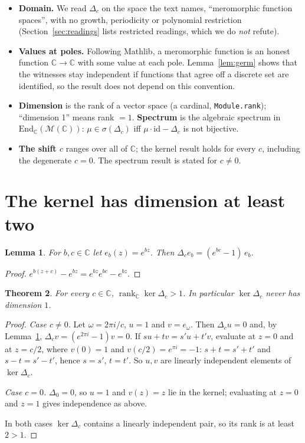 \documentclass[11pt]{article}
\newtheorem{theorem}{Theorem}
\newtheorem{lemma}[theorem]{Lemma}
\theoremstyle{definition}
\theoremstyle{remark}
\renewcommand{\_}{\oldus\allowbreak}
\newcommand{\M}{\mathcal{M}(\mathbb{C})}
\begin{document}
\begin{itemize}[nosep]
\item \textbf{Domain.} We read $\Delta_c$ on the space the text names, ``meromorphic function spaces'',
  with no growth, periodicity or polynomial restriction (Section~\ref{sec:readings} lists restricted
  readings, which we do \emph{not} refute).
\item \textbf{Values at poles.} Following Mathlib, a meromorphic function is an honest function
  $\mathbb{C}\to\mathbb{C}$ with some value at each pole. Lemma~\ref{lem:germ} shows that the witnesses
  stay independent if functions that agree off a discrete set are identified, so the result does not
  depend on this convention.
\item \textbf{Dimension} is the rank of a vector space (a cardinal, \texttt{Module.rank}); ``dimension 1''
  means rank $=1$. \textbf{Spectrum} is the algebraic spectrum in $\mathrm{End}_{\mathbb{C}}(\M)$:
  $\mu\in\sigma(\Delta_c)$ iff $\mu\cdot\mathrm{id}-\Delta_c$ is not bijective.
\item \textbf{The shift $c$} ranges over all of $\mathbb{C}$; the kernel result holds for every $c$,
  including the degenerate $c=0$. The spectrum result is stated for $c\neq 0$.
\end{itemize}

\section{The kernel has dimension at least two}

\begin{lemma}\label{lem:eigen}
For $b,c\in\mathbb{C}$ let $e_b(z)=e^{bz}$. Then $\Delta_c e_b = (e^{bc}-1)\,e_b$.
\end{lemma}
\begin{proof}
$e^{b(z+c)}-e^{bz} = e^{bz}e^{bc}-e^{bz}$.
\end{proof}

\begin{theorem}\label{thm:main}
For every $c\in\mathbb{C}$, $\operatorname{rank}_{\mathbb{C}}\ker\Delta_c > 1$. In particular
$\ker \Delta_c$ never has dimension $1$.
\end{theorem}
\begin{proof}
\emph{Case $c\neq 0$.} Let $\omega = 2\pi i/c$, $u=1$ and $v=e_\omega$. Then $\Delta_c u = 0$ and, by
Lemma~\ref{lem:eigen}, $\Delta_c v = (e^{2\pi i}-1)v = 0$. If $su+tv = s'u+t'v$, evaluate at $z=0$ and at
$z=c/2$, where $v(0)=1$ and $v(c/2)=e^{\pi i}=-1$: $s+t=s'+t'$ and $s-t=s'-t'$, hence $s=s'$, $t=t'$. So
$u,v$ are linearly independent elements of $\ker\Delta_c$.

\emph{Case $c=0$.} $\Delta_0=0$, so $u=1$ and $v(z)=z$ lie in the kernel; evaluating at $z=0$ and $z=1$
gives independence as above.

In both cases $\ker\Delta_c$ contains a linearly independent pair, so its rank is at least $2>1$.
\end{proof}
\end{document}

